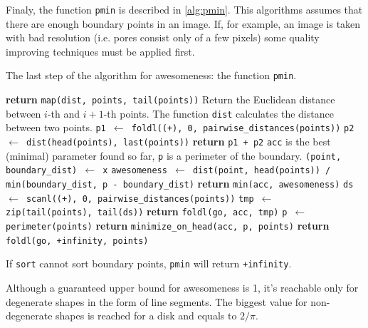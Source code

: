 \documentclass[reprint,amsmath,amssymb,aps,pre,showkeys,showpacs]{revtex4-1}
\begin{document}
Finaly, the function \texttt{pmin} is described in \cref{alg:pmin}. This
algorithms assumes that there are enough boundary points in an image. If, for
example, an image is taken with bad resolution (i.e. pores consist only of a few
pixels) some quality improving techniques must be applied first.
\begin{algorithm}[H]
  \caption{The last step of the algorithm for awesomeness: the function \texttt{pmin}.}
  \label{alg:pmin}
  \begin{algorithmic}[1]
    \State \textbf{return} \texttt{map(dist, points, tail(points))}
    \Comment Return the Euclidean distance between $i$-th and $i+1$-th
    points. The function \texttt{dist} calculates the distance between two
    points.
    \EndProcedure
    \State \texttt{p1 $\gets$ foldl((+), 0, pairwise\_distances(points))}
    \State \texttt{p2 $\gets$ dist(head(points), last(points))}
    \State \textbf{return} \texttt{p1 + p2}
    \EndProcedure
    \Comment \texttt{acc} is the best (minimal) parameter found so far,
    \texttt{p} is a perimeter of the boundary.
    \State \texttt{(point, boundary\_dist) $\gets$ x}
    \State \texttt{awesomeness $\gets$ dist(point, head(points)) /
      min(boundary\_dist, p - boundary\_dist)}
    \State \textbf{return} \texttt{min(acc, awesomeness)}
    \EndProcedure
    \State \texttt{ds $\gets$ scanl((+), 0, pairwise\_distances(points))}
    \State \texttt{tmp $\gets$ zip(tail(points), tail(ds))}
    \State \textbf{return} \texttt{foldl(go, acc, tmp)}
    \EndProcedure
    \State \texttt{p $\gets$ perimeter(points)}
    \State \textbf{return} \texttt{minimize\_on\_head(acc, p, points)}
    \EndProcedure
    \State \textbf{return} \texttt{foldl(go, +infinity, points)}
    \EndProcedure
  \end{algorithmic}
\end{algorithm}
If \texttt{sort} cannot sort boundary points, \texttt{pmin} will return
\texttt{+infinity}.

Although a guaranteed upper bound for awesomeness is 1, it's reachable only for
degenerate shapes in the form of line segments. The biggest value for
non-degenerate shapes is reached for a disk and equals to $2/\pi$.
\end{document}
